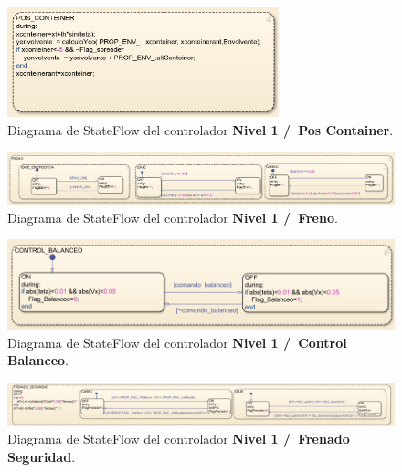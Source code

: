 \documentclass[11pt]{article}
\begin{document}
\begin{figure}
	\centering
	\includegraphics[width=0.7\textwidth]{images/stateflow_nivel_1/controlador_nivel1_pos_conteiner.png}
	\caption{Diagrama de StateFlow del controlador \textbf{Nivel 1 /\ Pos Container}.}
	\label{fig:nivel_1_pos_container}
\end{figure}

\begin{figure}
	\centering
	\includegraphics[width=1\textwidth]{images/stateflow_nivel_1/controlador_nivel1_freno.png}
	\caption{Diagrama de StateFlow del controlador \textbf{Nivel 1 /\ Freno}.}
	\label{fig:nivel_1_freno}
\end{figure}

\begin{figure}
	\centering
	\includegraphics[width=1\textwidth]{images/stateflow_nivel_1/controlador_nivel1_control_balanceo.png}
	\caption{Diagrama de StateFlow del controlador \textbf{Nivel 1 /\ Control Balanceo}.}
	\label{fig:nivel_1_control_balanceo}
\end{figure}

\begin{figure}
	\centering
	\includegraphics[width=1\textwidth]{images/stateflow_nivel_1/controlador_nivel1_freno_seguridad.png}
	\caption{Diagrama de StateFlow del controlador \textbf{Nivel 1 /\ Frenado Seguridad}.}
	\label{fig:nivel_1_frenado_seguridad}
\end{figure}
\end{document}
